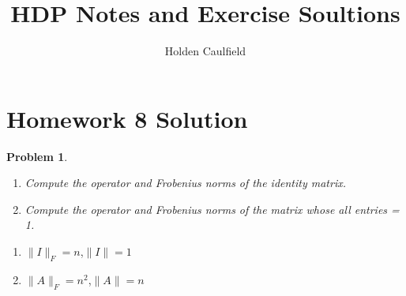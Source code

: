 \documentclass[12pt]{article}
\title{HDP Notes and Exercise Soultions}
\author{Holden Caulfield}
\newtheorem{ex}{Problem}
\begin{document}
	\centering	\section*{Homework 8 Solution}
	
	\begin{bx}
		
		\begin{ex}
		\;
			\begin{enumerate}[label=(\alph*)] 
				
			\item Compute the operator and Frobenius norms of the identity matrix.
			\item Compute the operator and Frobenius norms of the matrix whose all entries = 1.
				
			\end{enumerate}
		\end{ex}
		\tcblower
		\begin{enumerate}[label=(\alph*)]
		\item $\|I\|_F=n$,$\|I\|=1$
		\item $\|A\|_F=n^2$,$\|A\|=n$
		 \end{enumerate}
		\end{bx}
	
\end{document}
